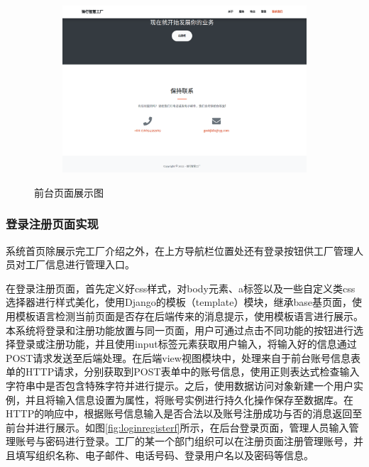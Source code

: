 \begin{figure}[H]
\begin{subfigure}{.45\textwidth}
    \end{subfigure}
    \qquad
    \begin{subfigure}{.45\textwidth}
        \centering
        \includegraphics[width=\textwidth]{figures/5index4.png}
    \end{subfigure}
    \caption{前台页面展示图}
    \label{fig:index}
\end{figure}

\subsubsection{登录注册页面实现}

系统首页除展示完工厂介绍之外，在上方导航栏位置处还有登录按钮供工厂管理人员对工厂信息进行管理入口。

在登录注册页面，首先定义好css样式，对body元素、a标签以及一些自定义类css选择器进行样式美化，使用Django的模板（template）模块，继承base基页面，使用模板语言检测当前页面是否存在后端传来的消息提示，使用模板语言进行展示。本系统将登录和注册功能放置与同一页面，用户可通过点击不同功能的按钮进行选择登录或注册功能，并且使用input标签元素获取用户输入，将输入好的信息通过POST请求发送至后端处理。在后端view视图模块中，处理来自于前台账号信息表单的HTTP请求，分别获取到POST表单中的账号信息，使用正则表达式检查输入字符串中是否包含特殊字符并进行提示。之后，使用数据访问对象新建一个用户实例，并且将输入信息设置为属性，将账号实例进行持久化操作保存至数据库。在HTTP的响应中，根据账号信息输入是否合法以及账号注册成功与否的消息返回至前台并进行展示。如图\ref{fig:loginregisterf}所示，在后台登录页面，管理人员输入管理账号与密码进行登录。工厂的某一个部门组织可以在注册页面注册管理账号，并且填写组织名称、电子邮件、电话号码、登录用户名以及密码等信息。

